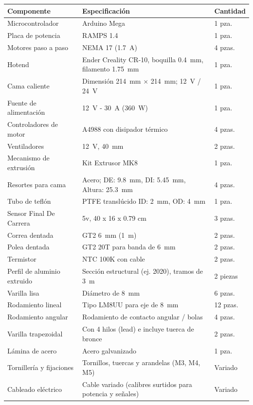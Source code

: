 \begin{tabularx}{\textwidth}{>{\raggedright\arraybackslash}p{3.8cm} Y l}
    \toprule
    \textbf{Componente} & \textbf{Especificación} & \textbf{Cantidad} \\
    \midrule
    Microcontrolador & Arduino Mega & 1 pza. \\
    Placa de potencia & RAMPS 1.4 & 1 pza. \\
    Motores paso a paso & NEMA 17 (\qty{1.7}{\A}) & 4 pzas. \\
    Hotend & Ender Creality CR-10, boquilla \qty{0.4}{\mm}, filamento \qty{1.75}{\mm} & 1 pza. \\
    Cama caliente & Dimensión \qty{214}{\mm} $\times$ \qty{214}{\mm}; \qty{12}{\V} / \qty{24}{\V} & 1 pza. \\
    Fuente de alimentación & \qty{12}{\V} - \qty{30}{\A} (\qty{360}{\W}) & 1 pza. \\
    Controladores de motor & A4988 con disipador térmico & 4 pzas. \\
    Ventiladores & \qty{12}{\V}, \qty{40}{\mm} & 2 pzas. \\
    Mecanismo de extrusión & Kit Extrusor MK8 & 1 pza. \\
    Resortes para cama & Acero; DE: \qty{9.8}{\mm}, DI: \qty{5.45}{\mm}, Altura: \qty{25.3}{\mm} & 4 pzas. \\
    Tubo de teflón & PTFE translúcido ID: \qty{2}{\mm}, OD: \qty{4}{\mm} & 1 pza. \\
    Sensor Final De Carrera &  5v, 40 x 16 x 0.79 cm  & 3 pzas. \\
    Correa dentada & GT2 \qty{6}{\mm} (\qty{1}{\m}) & 2 pzas. \\
    Polea dentada & GT2 20T para banda de \qty{6}{\mm} & 2 pzas. \\
    Termistor & NTC 100K con cable & 2 pzas. \\
    Perfil de aluminio extruido & Sección estructural (ej. 2020), tramos de \qty{3}{\m} & 2 piezas \\
    Varilla lisa & Diámetro de \qty{8}{\mm} & 6 pzas. \\
    Rodamiento lineal & Tipo LM8UU para eje de \qty{8}{\mm} & 12 pzas. \\
    Rodamiento angular & Rodamiento de contacto angular / bolas & 4 pzas. \\
    Varilla trapezoidal & Con 4 hilos (lead) e incluye tuerca de bronce & 2 pzas. \\
    Lámina de acero & Acero galvanizado & 1 pza. \\
    Tornillería y fijaciones & Tornillos, tuercas y arandelas (M3, M4, M5) & Variado \\
    Cableado eléctrico & Cable variado (calibres surtidos para potencia y señales) & Variado \\
    \bottomrule
\end{tabularx}





